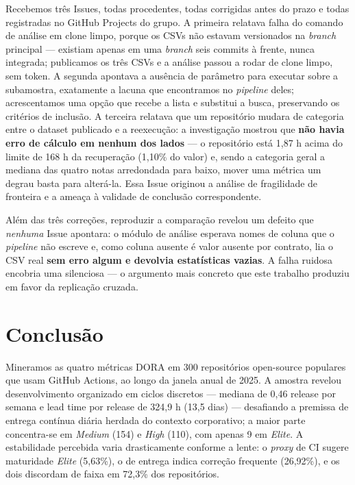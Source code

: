 \documentclass[12pt]{article}
\begin{document}
Recebemos três Issues, todas procedentes, todas corrigidas antes do prazo e todas registradas
no GitHub Projects do grupo. A primeira relatava falha do comando de análise em clone limpo,
porque os CSVs não estavam versionados na \emph{branch} principal --- existiam apenas em uma
\emph{branch} seis commits à frente, nunca integrada; publicamos os três CSVs e a análise
passou a rodar de clone limpo, sem token. A segunda apontava a ausência de parâmetro para
executar sobre a subamostra, exatamente a lacuna que encontramos no \emph{pipeline} deles;
acrescentamos uma opção que recebe a lista e substitui a busca, preservando os critérios de
inclusão. A terceira relatava que um repositório mudara de categoria entre o dataset
publicado e a reexecução: a investigação mostrou que \textbf{não havia erro de cálculo em
nenhum dos lados} --- o repositório está 1,87 h acima do limite de 168 h da recuperação
(1,10\% do valor) e, sendo a categoria geral a mediana das quatro notas arredondada para
baixo, mover uma métrica um degrau basta para alterá-la. Essa Issue originou a análise de
fragilidade de fronteira e a ameaça à validade de conclusão correspondente.

Além das três correções, reproduzir a comparação revelou um defeito que \emph{nenhuma} Issue
apontara: o módulo de análise esperava nomes de coluna que o \emph{pipeline} não escreve e,
como coluna ausente é valor ausente por contrato, lia o CSV real \textbf{sem erro algum e
devolvia estatísticas vazias}. A falha ruidosa encobria uma silenciosa --- o argumento mais
concreto que este trabalho produziu em favor da replicação cruzada.

\section{Conclusão}
\label{sec:conclusao}

Mineramos as quatro métricas DORA em 300 repositórios open-source populares que usam GitHub
Actions, ao longo da janela anual de 2025. A amostra revelou desenvolvimento organizado em
ciclos discretos --- mediana de 0,46 release por semana e lead time por release de 324,9 h
(13,5 dias) --- desafiando a premissa de entrega contínua diária herdada do contexto
corporativo; a maior parte concentra-se em \emph{Medium} (154) e \emph{High} (110), com apenas
9 em \emph{Elite}. A estabilidade percebida varia drasticamente conforme a lente: o
\emph{proxy} de CI sugere maturidade \emph{Elite} (5,63\%), o de entrega indica correção
frequente (26,92\%), e os dois discordam de faixa em 72,3\% dos repositórios.
\end{document}
